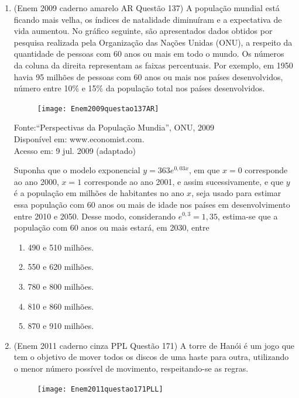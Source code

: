\begin{enumerate}
	\item (Enem 2009 caderno amarelo AR Questão 137) A população mundial está ficando mais velha, os índices de natalidade diminuíram e a expectativa de vida aumentou. No gráfico seguinte, são apresentados dados obtidos por pesquisa realizada pela Organização das Nações Unidas (ONU), a respeito da quantidade de pessoas com 60 anos ou mais em todo o mundo. Os números da coluna da direita representam as faixas percentuais. Por exemplo, em 1950 havia 95 milhões de pessoas com 60 anos ou mais nos países desenvolvidos, número entre 10\% e 15\% da população total nos países desenvolvidos.
	\begin{figure}[H]
		\centering
		\texttt{[image: Enem2009questao137AR]}
		\caption{}
		\label{fig:enem2009questao137ar}
	\end{figure}		
	\begin{flushright}
		{\tiny Fonte:``Perspectivas da População Mundia'', ONU, 2009\\
			Disponível em: www.economist.com.\\ 
			Acesso em: 9 jul. 2009 (adaptado)\\}
	\end{flushright}
	
	Suponha que o modelo exponencial $ y=363e^{0,03x} $, em que $ x=0 $ corresponde ao ano 2000, $ x=1 $ corresponde ao ano 2001, e assim sucessivamente, e que $ y $ é a população em milhões de habitantes no ano $ x $, seja usado para estimar essa população com 60 anos ou mais de idade nos países em desenvolvimento entre 2010 e 2050.
	Desse modo, considerando $ e^{0,3}=1,35 $, estima-se que a população com 60 anos ou mais estará, em 2030, entre
	\begin{enumerate}
		\item 490 e 510 milhões.
		\item 550 e 620 milhões.
		\item 780 e 800 milhões.
		\item 810 e 860 milhões.
		\item 870 e 910 milhões. 
	\end{enumerate}
	\clearpage
	\item (Enem 2011 caderno cinza PPL Questão 171) A torre de Hanói é um jogo que tem o objetivo de mover todos os discos de uma haste para outra, utilizando o menor número possível de movimento, respeitando-se as regras.
	\begin{figure}[H]
		\centering
		\texttt{[image: Enem2011questao171PLL]}
		\caption{}
		\label{fig:enem2011questao171pll}
	\end{figure}
	

\end{enumerate}
